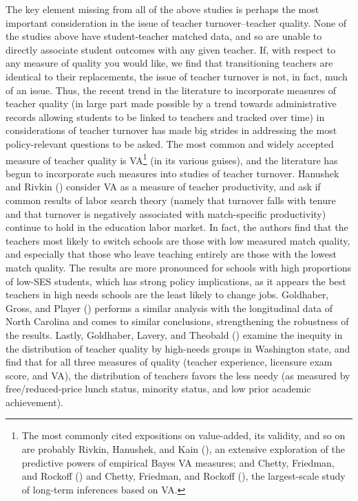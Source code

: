 The key element missing from all of the above studies is perhaps the
most important consideration in the issue of teacher turnover--teacher
quality. None of the studies above have student-teacher matched data,
and so are unable to directly associate student outcomes with any given
teacher. If, with respect to any measure of quality you would like, we
find that transitioning teachers are identical to their replacements,
the issue of teacher turnover is not, in fact, much of an issue. Thus,
the recent trend in the literature to incorporate measures of teacher
quality (in large part made possible by a trend towards administrative
records allowing students to be linked to teachers and tracked over
time) in considerations of teacher turnover has made big strides in
addressing the most policy-relevant questions to be asked. The most
common and widely accepted measure of teacher quality is VA\footnote{The
  most commonly cited expositions on value-added, its validity, and so
  on are probably Rivkin, Hanushek, and Kain
  (\citeyear{rivkin}), an extensive exploration of
  the predictive powers of empirical Bayes VA measures; and Chetty,
  Friedman, and Rockoff
  (\citeyear{chettyI})
  and Chetty, Friedman, and Rockoff
  (\citeyear{chettyII}),
  the largest-scale study of long-term inferences based on VA.} (in its
various guises), and the literature has begun to incorporate such
measures into studies of teacher turnover. Hanushek and Rivkin
(\citeyear{hanushek2010}) consider VA as a measure of
teacher productivity, and ask if common results of labor search theory
(namely that turnover falls with tenure and that turnover is negatively
associated with match-specific productivity) continue to hold in the
education labor market. In fact, the authors find that the teachers most
likely to switch schools are those with low measured match quality, and
especially that those who leave teaching entirely are those with the
lowest match quality. The results are more pronounced for schools with
high proportions of low-SES students, which has strong policy
implications, as it appears the best teachers in high needs schools are
the least likely to change jobs. Goldhaber, Gross, and Player
(\citeyear{goldhaber2007}) performs a similar
analysis with the longitudinal data of North Carolina and comes to
similar conclusions, strengthening the robustness of the results.
Lastly, Goldhaber, Lavery, and Theobald
(\citeyear{goldhaber2015}) examine the inequity in
the distribution of teacher quality by high-needs groups in Washington
state, and find that for all three measures of quality (teacher
experience, licensure exam score, and VA), the distribution of teachers
favors the less needy (as measured by free/reduced-price lunch status,
minority status, and low prior academic achievement).

